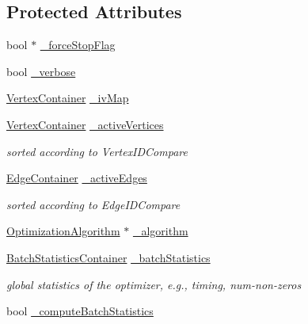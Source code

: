 \subsection*{Protected Attributes}
\begin{DoxyCompactItemize}
\item 
bool $\ast$ \mbox{\hyperlink{classg2o_1_1_sparse_optimizer_aac4a9f9b7d875ee40cae55f98d3437ab}{\+\_\+force\+Stop\+Flag}}
\item 
bool \mbox{\hyperlink{classg2o_1_1_sparse_optimizer_a41b3803182a4db6c0ff8c8d4352dd149}{\+\_\+verbose}}
\item 
\mbox{\hyperlink{structg2o_1_1_optimizable_graph_a54f01b9b6071e65e6abeebe4afb29dec}{Vertex\+Container}} \mbox{\hyperlink{classg2o_1_1_sparse_optimizer_a488b95a90a61454c787e9c13458e510b}{\+\_\+iv\+Map}}
\item 
\mbox{\hyperlink{structg2o_1_1_optimizable_graph_a54f01b9b6071e65e6abeebe4afb29dec}{Vertex\+Container}} \mbox{\hyperlink{classg2o_1_1_sparse_optimizer_a805e1db97802980fa4dfef95cfa5e63e}{\+\_\+active\+Vertices}}
\begin{DoxyCompactList}\small\item\em sorted according to Vertex\+I\+D\+Compare \end{DoxyCompactList}\item 
\mbox{\hyperlink{structg2o_1_1_optimizable_graph_a2b43e807ae6d61ef8749ca1ef7c25f62}{Edge\+Container}} \mbox{\hyperlink{classg2o_1_1_sparse_optimizer_a3207df163943bc1672fc7872964a6d6c}{\+\_\+active\+Edges}}
\begin{DoxyCompactList}\small\item\em sorted according to Edge\+I\+D\+Compare \end{DoxyCompactList}\item 
\mbox{\hyperlink{classg2o_1_1_optimization_algorithm}{Optimization\+Algorithm}} $\ast$ \mbox{\hyperlink{classg2o_1_1_sparse_optimizer_a665d4ba54db76a1174bfc85a6dbc5127}{\+\_\+algorithm}}
\item 
\mbox{\hyperlink{namespaceg2o_a526b32fde21f83173acb2bb29db68275}{Batch\+Statistics\+Container}} \mbox{\hyperlink{classg2o_1_1_sparse_optimizer_a21215378d9e8de28aee8d55b4d25ff89}{\+\_\+batch\+Statistics}}
\begin{DoxyCompactList}\small\item\em global statistics of the optimizer, e.\+g., timing, num-\/non-\/zeros \end{DoxyCompactList}\item 
bool \mbox{\hyperlink{classg2o_1_1_sparse_optimizer_a3bd44c498c4d983c092f23673de14d5d}{\+\_\+compute\+Batch\+Statistics}}
\end{DoxyCompactItemize}
